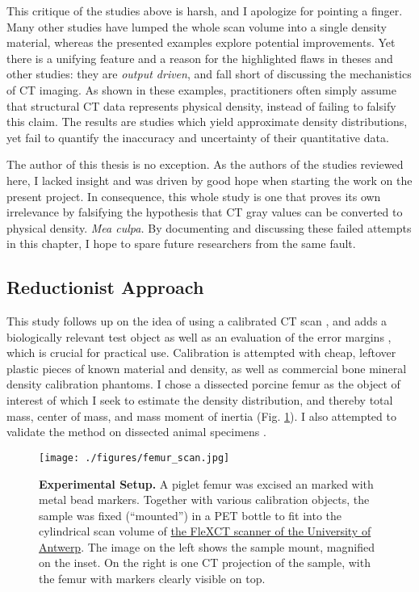 This critique of the studies above is harsh, and I apologize for pointing a finger.
Many other studies have lumped the whole scan volume into a single density material, whereas the presented examples explore potential improvements.
Yet there is a unifying feature and a reason for the highlighted flaws in theses and other studies: they are \emph{output driven}, and fall short of discussing the mechanistics of CT imaging.
As shown in these examples, practitioners often simply assume that structural CT data represents physical density, instead of failing to falsify this claim.
The results are studies which yield approximate density distributions, yet fail to quantify the inaccuracy and uncertainty of their quantitative data.


The author of this thesis is no exception.
As the authors of the studies reviewed here, I lacked insight and was driven by good hope when starting the work on the present project.
In consequence, this whole study is one that proves its own irrelevance by falsifying the hypothesis that CT gray values can be converted to physical density.
\emph{Mea culpa.}
By documenting and discussing these failed attempts in this chapter, I hope to spare future researchers from the same fault.


\subsection{Reductionist Approach}
\label{sec:orgbcd4889}
This study follows up on the idea of using a calibrated CT scan \citep{DuPlessis2013}, and adds a biologically relevant test object as well as an evaluation of the error margins \citep{Hughes2010,Arroyave2022,Myers2015}, which is crucial for practical use.
Calibration is attempted with cheap, leftover plastic pieces of known material and density, as well as commercial bone mineral density calibration phantoms.
I chose a dissected porcine femur as the object of interest of which I seek to estimate the density distribution, and thereby total mass, center of mass, and mass moment of inertia (Fig. \ref{fig:femur_scan}).
I also attempted to validate the method on dissected animal specimens \citep[as][, but less sophisticated]{Durston2022}.

\begin{figure}[htbp]
\centering
\texttt{[image: ./figures/femur\_scan.jpg]}
\caption{\label{fig:femur_scan}\textbf{Experimental Setup.} A piglet femur was excised an marked with metal bead markers. Together with various calibration objects, the sample was fixed (``mounted'') in a PET bottle to fit into the cylindrical scan volume of \href{https://www.uantwerpen.be/en/research-groups/vision-lab/x-ray-imaging-resear/flexct}{the FleXCT scanner of the University of Antwerp}. The image on the left shows the sample mount, magnified on the inset. On the right is one CT projection of the sample, with the femur with markers clearly visible on top.}
\end{figure}


